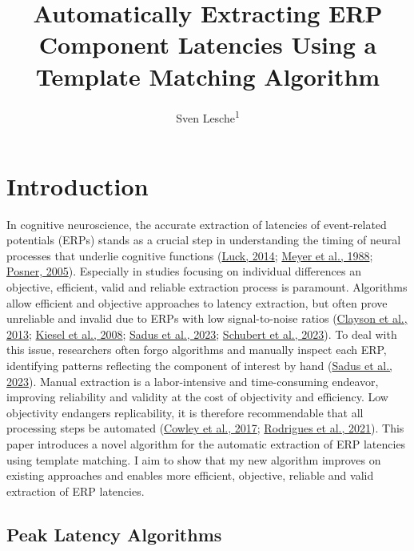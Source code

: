 \documentclass[
  man]{apa7}
\title{Automatically Extracting ERP Component Latencies Using a Template Matching Algorithm}
\author{Sven Lesche\textsuperscript{1}}
\date{}
\affiliation{\vspace{0.5cm}\textsuperscript{1} Ruprecht-Karls-University Heidelberg}
\begin{document}
\maketitle

\hypertarget{introduction}{%
\section{Introduction}\label{introduction}}

In cognitive neuroscience, the accurate extraction of latencies of event-related potentials (ERPs) stands as a crucial step in understanding the timing of neural processes that underlie cognitive functions (\protect\hyperlink{ref-luck2014introduction}{Luck, 2014}; \protect\hyperlink{ref-meyer1988modern}{Meyer et al., 1988}; \protect\hyperlink{ref-posner2005timing}{Posner, 2005}). Especially in studies focusing on individual differences an objective, efficient, valid and reliable extraction process is paramount. Algorithms allow efficient and objective approaches to latency extraction, but often prove unreliable and invalid due to ERPs with low signal-to-noise ratios (\protect\hyperlink{ref-clayson2013noise}{Clayson et al., 2013}; \protect\hyperlink{ref-kiesel2008measurement}{Kiesel et al., 2008}; \protect\hyperlink{ref-sadus2023multiverse}{Sadus et al., 2023}; \protect\hyperlink{ref-schubert2023robust}{Schubert et al., 2023}). To deal with this issue, researchers often forgo algorithms and manually inspect each ERP, identifying patterns reflecting the component of interest by hand (\protect\hyperlink{ref-sadus2023multiverse}{Sadus et al., 2023}). Manual extraction is a labor-intensive and time-consuming endeavor, improving reliability and validity at the cost of objectivity and efficiency. Low objectivity endangers replicability, it is therefore recommendable that all processing steps be automated (\protect\hyperlink{ref-cowley2017computational}{Cowley et al., 2017}; \protect\hyperlink{ref-rodrigues2021epos}{Rodrigues et al., 2021}). This paper introduces a novel algorithm for the automatic extraction of ERP latencies using template matching. I aim to show that my new algorithm improves on existing approaches and enables more efficient, objective, reliable and valid extraction of ERP latencies.

\hypertarget{peak-latency-algorithms}{%
\subsection{Peak Latency Algorithms}\label{peak-latency-algorithms}}
\end{document}
